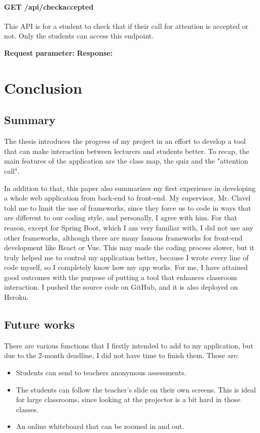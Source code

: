 \documentclass[a4paper, 11pt,openany]{book} %
\begin{document}
\subsubsection{GET /api/checkaccepted}
This API is for a student to check that if their call for attention is accepted or not. Only the students can access this endpoint.  \par
\textbf{Request parameter:}
\textbf{Response:}
\chapter{Conclusion}
\section{Summary}
The thesis introduces the progress of my project in an effort to develop a tool that can make interaction between lecturers and students better. To recap, the main features of the application are the class map, the quiz and the "attention call". \par

In addition to that, this paper also summarizes my first experience in developing a whole web application from back-end to front-end. My supervisor, Mr. Clavel told me to limit the use of frameworks, since they force us to code in ways that are different to our coding style, and personally, I agree with him. For that reason, except for Spring Boot, which I am very familiar with, I did not use any other frameworks, although there are many famous frameworks for front-end development like React or Vue. This may made the coding process slower, but it truly helped me to control my application better, because I wrote every line of code myself, so I completely know how my app works. For me, I have attained good outcomes with the purpose of putting a tool that enhances classroom interaction. I pushed the source code on GitHub, and it is also deployed on Heroku. \par 

\section{Future works}
There are various functions that I firstly intended to add to my application, but due to the 2-month deadline, I did not have time to finish them. Those are:
\begin{itemize}
    \item Students can send to teachers anonymous assessments.
    \item The students can follow the teacher's slide on their own screens. This is ideal for large classrooms, since looking at the projector is a bit hard in those classes.
    \item An online whiteboard that can be zoomed in and out.
\end{itemize}



\printbibliography[title = References]
\end{document}
